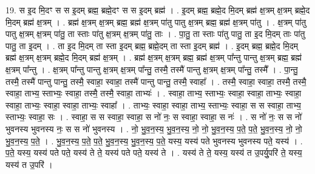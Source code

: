 \documentclass[17pt]{extarticle}
\begin{document}
19. स इ॒द मि॒दꣳ स स इ॒दम् ब्रह्म॒ ब्रह्मे॒दꣳ स स इ॒दम् ब्रह्म॑ । . इ॒दम् ब्रह्म॒ ब्रह्मे॒द मि॒दम् ब्रह्म॑ क्ष॒त्रम् क्ष॒त्रम् ब्रह्मे॒द मि॒दम् ब्रह्म॑ क्ष॒त्रम् । . ब्रह्म॑ क्ष॒त्रम् क्ष॒त्रम् ब्रह्म॒ ब्रह्म॑ क्ष॒त्रम् पा॑तु पातु क्ष॒त्रम् ब्रह्म॒ ब्रह्म॑ क्ष॒त्रम् पा॑तु । . क्ष॒त्रम् पा॑तु पातु क्ष॒त्रम् क्ष॒त्रम् पा॑तु॒ ता स्ताः पा॑तु क्ष॒त्रम् क्ष॒त्रम् पा॑तु॒ ताः । . पा॒तु॒ ता स्ताः पा॑तु पातु॒ ता इ॒द मि॒दम् ताः पा॑तु पातु॒ ता इ॒दम् । . ता इ॒द मि॒दम् ता स्ता इ॒दम् ब्रह्म॒ ब्रह्मे॒दम् ता स्ता इ॒दम् ब्रह्म॑ । . इ॒दम् ब्रह्म॒ ब्रह्मे॒द मि॒दम् ब्रह्म॑ क्ष॒त्रम् क्ष॒त्रम् ब्रह्मे॒द मि॒दम् ब्रह्म॑ क्ष॒त्रम् । . ब्रह्म॑ क्ष॒त्रम् क्ष॒त्रम् ब्रह्म॒ ब्रह्म॑ क्ष॒त्रम् पा᳚न्तु पान्तु क्ष॒त्रम् ब्रह्म॒ ब्रह्म॑ क्ष॒त्रम् पा᳚न्तु । . क्ष॒त्रम् पा᳚न्तु पान्तु क्ष॒त्रम् क्ष॒त्रम् पा᳚न्तु॒ तस्मै॒ तस्मै॑ पान्तु क्ष॒त्रम् क्ष॒त्रम् पा᳚न्तु॒ तस्मै᳚ । . पा॒न्तु॒ तस्मै॒ तस्मै॑ पान्तु पान्तु॒ तस्मै॒ स्वाहा॒ स्वाहा॒ तस्मै॑ पान्तु पान्तु॒ तस्मै॒ स्वाहा᳚ । . तस्मै॒ स्वाहा॒ स्वाहा॒ तस्मै॒ तस्मै॒ स्वाहा॒ ताभ्य॒ स्ताभ्यः॒ स्वाहा॒ तस्मै॒ तस्मै॒ स्वाहा॒ ताभ्यः॑ । . स्वाहा॒ ताभ्य॒ स्ताभ्यः॒ स्वाहा॒ स्वाहा॒ ताभ्यः॒ स्वाहा॒ स्वाहा॒ ताभ्यः॒ स्वाहा॒ स्वाहा॒ ताभ्यः॒ स्वाहा᳚ । . ताभ्यः॒ स्वाहा॒ स्वाहा॒ ताभ्य॒ स्ताभ्यः॒ स्वाहा॒ स स स्वाहा॒ ताभ्य॒ स्ताभ्यः॒ स्वाहा॒ सः । . स्वाहा॒ स स स्वाहा॒ स्वाहा॒ स नो॑ नः॒ स स्वाहा॒ स्वाहा॒ स नः॑ । . स नो॑ नः॒ स स नो॑ भुवनस्य भुवनस्य नः॒ स स नो॑ भुवनस्य । . नो॒ भु॒व॒न॒स्य॒ भु॒व॒न॒स्य॒ नो॒ नो॒ भु॒व॒न॒स्य॒ प॒ते॒ प॒ते॒ भु॒व॒न॒स्य॒ नो॒ नो॒ भु॒व॒न॒स्य॒ प॒ते॒ । . भु॒व॒न॒स्य॒ प॒ते॒ प॒ते॒ भु॒व॒न॒स्य॒ भु॒व॒न॒स्य॒ प॒ते॒ यस्य॒ यस्य॑ पते भुवनस्य भुवनस्य पते॒ यस्य॑ । . प॒ते॒ यस्य॒ यस्य॑ पते पते॒ यस्य॑ ते ते॒ यस्य॑ पते पते॒ यस्य॑ ते । . यस्य॑ ते ते॒ यस्य॒ यस्य॑ त उ॒पर्यु॒परि॑ ते॒ यस्य॒ यस्य॑ त उ॒परि॑ । \newline
\end{document}
